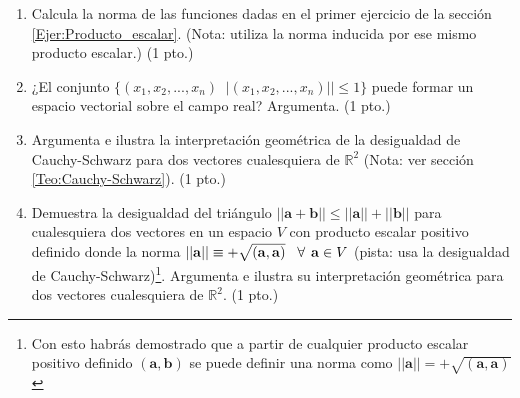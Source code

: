 \documentclass[12pt]{article}
\begin{document}
\begin{enumerate}
    \item Calcula la norma de las funciones dadas en el primer ejercicio de la sección \ref{Ejer:Producto_escalar}. (Nota: utiliza la norma inducida por ese mismo producto escalar.) (1 pto.)
    \item ¿El conjunto $\{(x_1,x_2,...,x_n)\mathop|\mathop x_i\in\mathbb{R} \land ||(x_1,x_2,...,x_n)||\leq1\}$ puede formar un espacio vectorial sobre el campo real? Argumenta. (1 pto.)
    \item Argumenta e ilustra la interpretación geométrica de la desigualdad de Cauchy-Schwarz para dos vectores cualesquiera de $\mathbb{R}^2$ (Nota: ver sección \ref{Teo:Cauchy-Schwarz}). (1 pto.)
    \item Demuestra la desigualdad del triángulo $||\mathbf{a}+\mathbf{b}|| \leq ||\mathbf{a}||+||\mathbf{b}||$ para cualesquiera dos vectores en un espacio $V$ con producto escalar positivo definido donde la norma $||\mathbf{a}||\equiv+\sqrt{(\mathbf{a},\mathbf{a})}\hspace{3mm}\forall\hspace{1.5mm} \mathbf{a}\in V$ (pista: usa la desigualdad de Cauchy-Schwarz)\footnote{Con esto habrás demostrado que a partir de cualquier producto escalar positivo definido $(\mathbf{a},\mathbf{b})$ se puede definir una norma como $||\mathbf{a}|| = +\sqrt{(\mathbf{a},\mathbf{a})}$}. Argumenta e ilustra su interpretación geométrica para dos vectores cualesquiera de $\mathbb{R}^2$. (1 pto.)
\end{enumerate}
\end{document}
